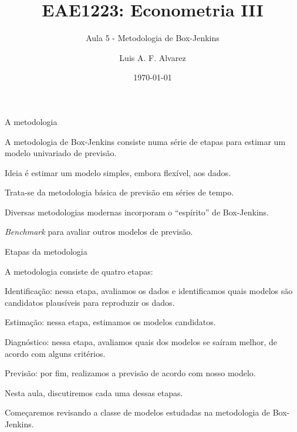 \documentclass[11pt]{beamer}
\author{Luis A. F. Alvarez}
\title{EAE1223: Econometria III}
\subtitle{Aula 5 - Metodologia de Box-Jenkins}
\date{\today}
\newenvironment{halfwideitemize}{\itemize\addtolength{\itemsep}{0.5em}}{\enditemize}
\newenvironment{halfwideenumerate}{\enumerate\addtolength{\itemsep}{0.5em}}{\endenumerate}
\begin{document}
\begin{frame}[plain]
	\maketitle
\end{frame}

\begin{frame}{A metodologia}
	\begin{halfwideitemize}
		\item A metodologia de Box-Jenkins consiste numa série de etapas para estimar um modelo {\color{blue}univariado} de {\color{blue}previsão}.
		\begin{halfwideitemize}
			\item Ideia é estimar um modelo simples, embora flexível, aos dados.
		
		\end{halfwideitemize}
	\item Trata-se da metodologia básica de previsão em séries de tempo. 
\begin{halfwideitemize}
	\item Diversas metodologias modernas incorporam o ``espírito'' de Box-Jenkins.
	\item \textit{Benchmark} para avaliar outros modelos de previsão.
\end{halfwideitemize}
	\end{halfwideitemize}
\end{frame}

\begin{frame}{Etapas da metodologia}
	\begin{halfwideitemize}
			\item A metodologia consiste de quatro etapas:
	\begin{halfwideenumerate}
		\item {\color{blue}Identificação}: nessa etapa, avaliamos os dados e identificamos quais modelos são candidatos plausíveis para reproduzir os dados.
		\item {\color{blue} Estimação}: nessa etapa, estimamos os modelos candidatos.
		\item {\color{blue} Diagnóstico:} nessa etapa, avaliamos quais dos modelos se saíram melhor, de acordo com alguns critérios.
		\item {\color{blue} Previsão:} por fim, realizamos a previsão de acordo com nosso modelo.
	\end{halfwideenumerate}
	\item Nesta aula, discutiremos cada uma dessas etapas.
	\item Começaremos revisando a classe de modelos estudadas na metodologia de Box-Jenkins.
\end{halfwideitemize}
\end{frame}
\end{document}
